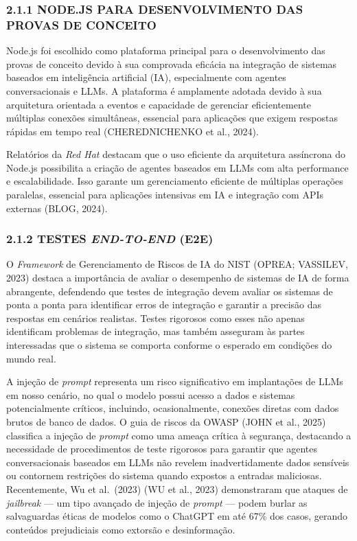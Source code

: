 \documentclass[
]{article}
\begin{document}
\subsubsection{2.1.1 NODE.JS PARA DESENVOLVIMENTO DAS PROVAS DE
CONCEITO}\label{node.js-para-desenvolvimento-das-provas-de-conceito}

Node.js foi escolhido como plataforma principal para o desenvolvimento
das provas de conceito devido à sua comprovada eficácia na integração de
sistemas baseados em inteligência artificial (IA), especialmente com
agentes conversacionais e LLMs. A plataforma é amplamente adotada devido
à sua arquitetura orientada a eventos e capacidade de gerenciar
eficientemente múltiplas conexões simultâneas, essencial para aplicações
que exigem respostas rápidas em tempo real (CHEREDNICHENKO et al.,
2024).

Relatórios da \emph{Red Hat} destacam que o uso eficiente da arquitetura
assíncrona do Node.js possibilita a criação de agentes baseados em LLMs
com alta performance e escalabilidade. Isso garante um gerenciamento
eficiente de múltiplas operações paralelas, essencial para aplicações
intensivas em IA e integração com APIs externas (BLOG, 2024).

\subsubsection{\texorpdfstring{2.1.2 TESTES \emph{END-TO-END}
(E2E)}{2.1.2 TESTES END-TO-END (E2E)}}\label{testes-end-to-end-e2e}

O \emph{Framework} de Gerenciamento de Riscos de IA do NIST (OPREA;
VASSILEV, 2023) destaca a importância de avaliar o desempenho de
sistemas de IA de forma abrangente, defendendo que testes de integração
devem avaliar os sistemas de ponta a ponta para identificar erros de
integração e garantir a precisão das respostas em cenários realistas.
Testes rigorosos como esses não apenas identificam problemas de
integração, mas também asseguram às partes interessadas que o sistema se
comporta conforme o esperado em condições do mundo real.

A injeção de \emph{prompt} representa um risco significativo em
implantações de LLMs em nosso cenário, no qual o modelo possui acesso a
dados e sistemas potencialmente críticos, incluindo, ocasionalmente,
conexões diretas com dados brutos de banco de dados. O guia de riscos da
OWASP (JOHN et al., 2025) classifica a injeção de \emph{prompt} como uma
ameaça crítica à segurança, destacando a necessidade de procedimentos de
teste rigorosos para garantir que agentes conversacionais baseados em
LLMs não revelem inadvertidamente dados sensíveis ou contornem
restrições do sistema quando expostos a entradas maliciosas.
Recentemente, Wu et al.~(2023) (WU et al., 2023) demonstraram que
ataques de \emph{jailbreak} --- um tipo avançado de injeção de
\emph{prompt} --- podem burlar as salvaguardas éticas de modelos como o
ChatGPT em até 67\% dos casos, gerando conteúdos prejudiciais como
extorsão e desinformação.
\end{document}
